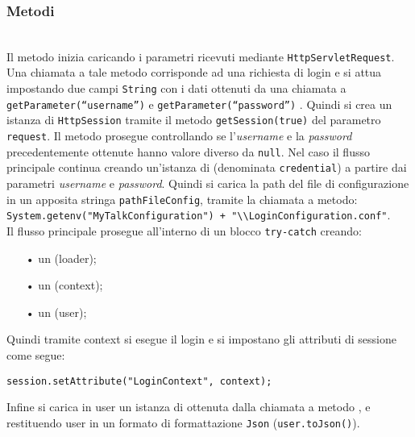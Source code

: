 \subsubsection*{Metodi}
\begin{description}
	\item{}\\

Il metodo inizia caricando i parametri ricevuti mediante \texttt{HttpServletRequest}. Una chiamata a tale metodo corrisponde ad una richiesta di login e si attua impostando due campi \texttt{String} con i dati ottenuti da una chiamata a \texttt{getParameter(``username'')} e \texttt{getParameter(``password'')} . Quindi si crea un istanza di \texttt{HttpSession} tramite il metodo \texttt{getSession(true)} del parametro \texttt{request}. Il metodo prosegue controllando se l'\textit{username} e la \textit{password} precedentemente ottenute hanno valore diverso da \texttt{null}. Nel caso il flusso principale continua creando un'istanza di  (denominata \texttt{credential}) a partire dai parametri \textit{username} e \textit{password}. Quindi si carica la path del file di configurazione in un apposita stringa \texttt{pathFileConfig}, tramite la chiamata a metodo:\\
	
\verb|System.getenv("MyTalkConfiguration") + "\\LoginConfiguration.conf"|.\\

Il flusso principale prosegue all'interno di un blocco \texttt{try-catch} creando:
	\begin{itemize}
		\item[•] un  (loader);
		\item[•] un  (context);
		\item[•] un  (user);
	\end{itemize}
Quindi tramite context si esegue il login e si impostano gli attributi di sessione come segue: 

\texttt{session.setAttribute("LoginContext", context);}

Infine si carica in user un istanza di  ottenuta dalla chiamata a metodo , e restituendo user in un formato di formattazione \texttt{Json} (\texttt{user.toJson()}).

\end{description}


